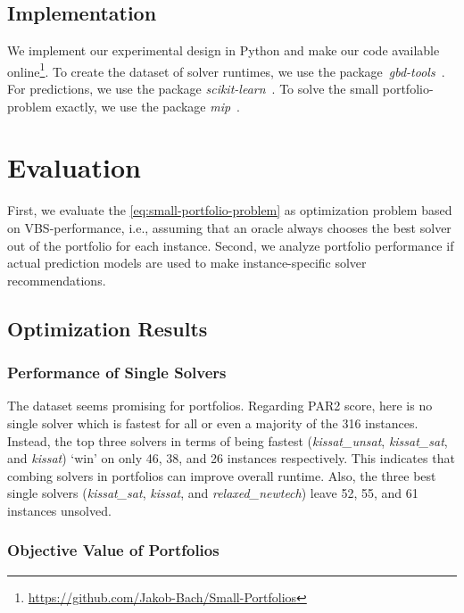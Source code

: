 \documentclass[conference]{IEEEtran}
\begin{document}
\subsection{Implementation}

We implement our experimental design in Python and make our code available online\footnote{\url{https://github.com/Jakob-Bach/Small-Portfolios}}.
To create the dataset of solver runtimes, we use the package~\emph{gbd-tools}~\cite{iser2020collaborative}.
For predictions, we use the package \emph{scikit-learn}~\cite{scikit-learn}.
To solve the small portfolio-problem exactly, we use the package \emph{mip}~\cite{python-mip}.

\section{Evaluation}
\label{sec:evaluation}

First, we evaluate the \ref{eq:small-portfolio-problem} as optimization problem based on VBS-performance, i.e., assuming that an oracle always chooses the best solver out of the portfolio for each instance.
Second, we analyze portfolio performance if actual prediction models are used to make instance-specific solver recommendations.

\subsection{Optimization Results}

\subsubsection{Performance of Single Solvers}

The dataset seems promising for portfolios.
Regarding PAR2 score, here is no single solver which is fastest for all or even a majority of the 316 instances.
Instead, the top three solvers in terms of being fastest (\emph{kissat\_unsat}, \emph{kissat\_sat}, and \emph{kissat}) `win' on only 46, 38, and 26 instances respectively.
This indicates that combing solvers in portfolios can improve overall runtime.
Also, the three best single solvers (\emph{kissat\_sat}, \emph{kissat}, and \emph{relaxed\_newtech}) leave 52, 55, and 61 instances unsolved.

\subsubsection{Objective Value of Portfolios}
\end{document}
